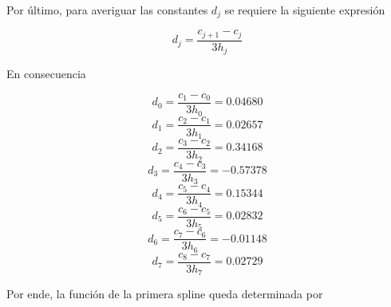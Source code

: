 Por último, para averiguar las constantes $d_j$ se requiere la siguiente expresión

\begin{equation}
    d_j = \frac{c_{j+1}-c_j}{3h_j}
\end{equation}

En consecuencia

\begin{equation}
    d_0 = \frac{c_{1}-c_0}{3h_0} = 0.04680 
\end{equation}
\begin{equation}
    d_1 = \frac{c_{2}-c_1}{3h_1} = 0.02657
\end{equation}
\begin{equation}
    d_2 = \frac{c_{3}-c_2}{3h_2} = 0.34168
\end{equation}
\begin{equation}
    d_3 = \frac{c_{4}-c_3}{3h_3} = -0.57378
\end{equation}
\begin{equation}
    d_4 = \frac{c_{5}-c_4}{3h_4} = 0.15344
\end{equation}
\begin{equation}
    d_5 = \frac{c_{6}-c_5}{3h_5} = 0.02832
\end{equation}
\begin{equation}
    d_6 = \frac{c_{7}-c_6}{3h_6} = -0.01148
\end{equation}
\begin{equation}
    d_7 = \frac{c_{8}-c_7}{3h_7} = 0.02729
\end{equation}

Por ende, la función de la primera spline queda determinada por

